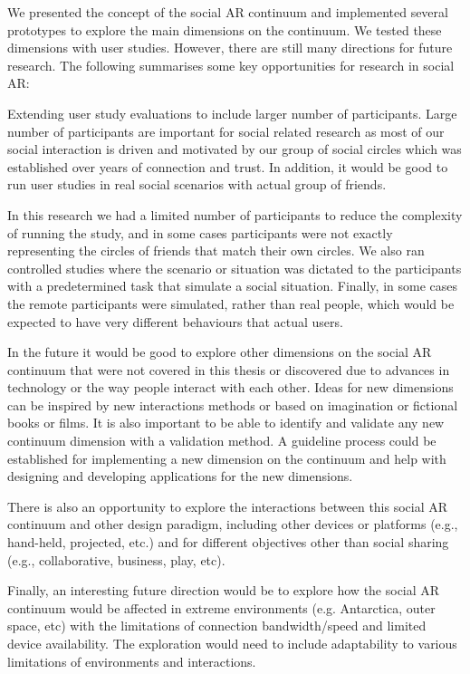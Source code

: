 We presented the concept of the social AR continuum and implemented several prototypes to explore the main dimensions on the continuum. We tested these dimensions with user studies. However, there are still many directions for future research. The following summarises some key opportunities for research in social AR:  

Extending user study evaluations to include larger number of participants. Large number of participants are important for social related research as most of our social interaction is driven and motivated by our group of social circles which was established over years of connection and trust.  In addition, it would be good to run user studies in real social scenarios with actual group of friends.

In this research we had a limited number of participants to reduce the complexity of running the study, and in some cases participants were not exactly representing the circles of friends that match their own circles. We also ran controlled studies where the scenario or situation was dictated to the participants with a predetermined task that simulate a social situation. Finally, in some cases the remote participants were simulated, rather than real people, which would be expected to have very different behaviours that actual users.

In the future it would be good to explore other dimensions on the social AR continuum that were not covered in this thesis or discovered due to advances in technology or the way people interact with each other. 
Ideas for new dimensions can be inspired by new interactions methods or based on imagination or fictional books or films. 
It is also important to be able to identify and validate any new continuum dimension with a validation method. A guideline process could be established for implementing a new dimension on the continuum and help with designing and developing applications for the new dimensions. 

There is also an opportunity to explore the interactions between this social AR continuum and other design paradigm, including other devices or platforms (e.g., hand-held, projected, etc.) and for different objectives other than social sharing (e.g., collaborative, business, play, etc).

Finally, an interesting future direction would be to explore how the social AR continuum would be affected in extreme environments (e.g. Antarctica, outer space, etc) with the limitations of connection bandwidth/speed and limited device availability. The exploration would need to include adaptability to various limitations of environments and interactions. 


